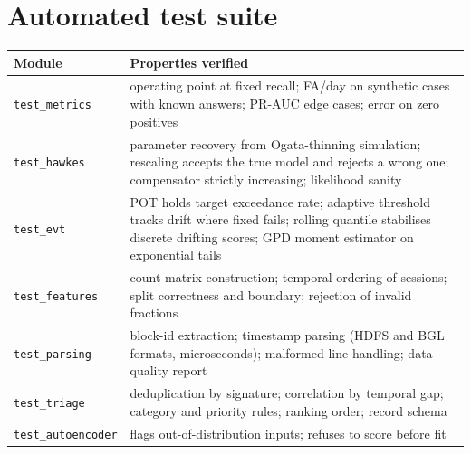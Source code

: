 \documentclass[11pt,a4paper]{report}
\newcommand{\code}[1]{\texttt{\small #1}}
\begin{document}
\chapter{Automated test suite}
\begin{table}[H]\centering\small
\renewcommand{\arraystretch}{1.25}
\begin{tabular}{@{}l p{8.6cm}@{}}
\toprule
\textbf{Module} & \textbf{Properties verified} \\
\midrule
\code{test\_metrics} & operating point at fixed recall; FA/day on synthetic
cases with known answers; PR-AUC edge cases; error on zero positives \\
\code{test\_hawkes} & parameter recovery from Ogata-thinning simulation;
rescaling accepts the true model and rejects a wrong one; compensator
strictly increasing; likelihood sanity \\
\code{test\_evt} & POT holds target exceedance rate; adaptive threshold
tracks drift where fixed fails; rolling quantile stabilises discrete
drifting scores; GPD moment estimator on exponential tails \\
\code{test\_features} & count-matrix construction; temporal ordering of
sessions; split correctness and boundary; rejection of invalid fractions \\
\code{test\_parsing} & block-id extraction; timestamp parsing (HDFS and
BGL formats, microseconds); malformed-line handling; data-quality report \\
\code{test\_triage} & deduplication by signature; correlation by temporal
gap; category and priority rules; ranking order; record schema \\
\code{test\_autoencoder} & flags out-of-distribution inputs; refuses to
score before fit \\
\bottomrule
\end{tabular}
\end{table}
\end{document}
